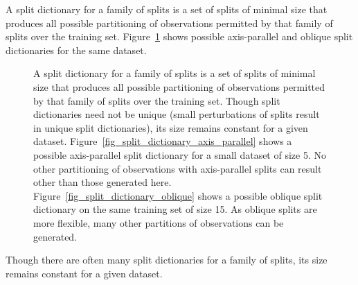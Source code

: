 A split dictionary for a family of splits is a set of splits of minimal size that produces all possible partitioning of observations permitted by that family of splits over the training set. Figure~\ref{fig_split_dictionaries} shows possible axis-parallel and oblique split dictionaries for the same dataset.
\begin{figure}
\centering
{}
\caption{
A split dictionary for a family of splits is a set of splits of minimal size that produces all possible partitioning of observations permitted by that family of splits over the training set. Though split dictionaries need not be unique (small perturbations of splits result in unique split dictionaries), its size remains constant for a given dataset. Figure~\ref{fig_split_dictionary_axis_parallel} shows a possible axis-parallel split dictionary for a small dataset of size 5. No other partitioning of observations with axis-parallel splits can result other than those generated here. Figure~\ref{fig_split_dictionary_oblique} shows a possible oblique split dictionary on the same training set of size 15. As oblique splits are more flexible, many other partitions of observations can be generated.}
\label{fig_split_dictionaries}
\end{figure}
Though there are often many split dictionaries for a family of splits, its size remains constant for a given dataset.\\

